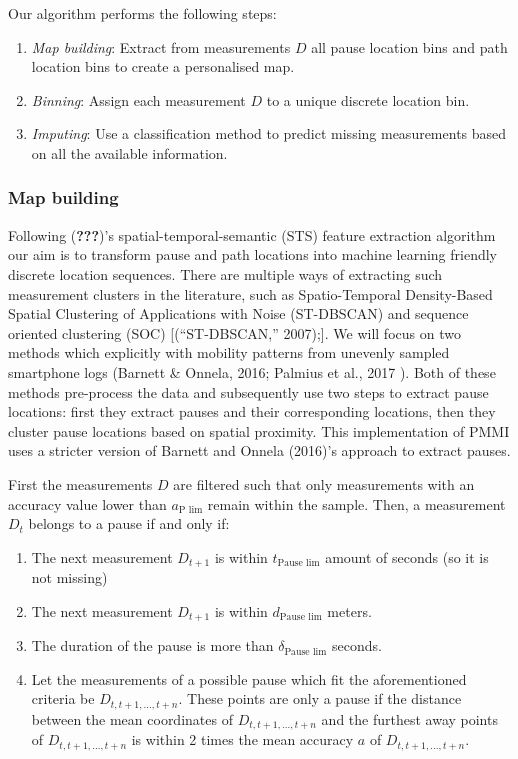 \documentclass[man]{apa6}
\providecommand{\tightlist}{%
  \setlength{\itemsep}{0pt}\setlength{\parskip}{0pt}}
\theoremstyle{definition}
\theoremstyle{definition}
\theoremstyle{definition}
\theoremstyle{remark}
\begin{document}
Our algorithm performs the following steps:

\begin{enumerate}
\def\labelenumi{\arabic{enumi}.}
\tightlist
\item
  \emph{Map building}: Extract from measurements \(D\) all pause
  location bins and path location bins to create a personalised map.
\item
  \emph{Binning}: Assign each measurement \(D\) to a unique discrete
  location bin.
\item
  \emph{Imputing}: Use a classification method to predict missing
  measurements based on all the available information.
\end{enumerate}

\subsubsection{Map building}\label{map-building}

Following ({\textbf{???}})'s spatial-temporal-semantic (STS) feature
extraction algorithm our aim is to transform pause and path locations
into machine learning friendly discrete location sequences. There are
multiple ways of extracting such measurement clusters in the literature,
such as Spatio-Temporal Density-Based Spatial Clustering of Applications
with Noise (ST-DBSCAN) and sequence oriented clustering (SOC)
{[}(``ST-DBSCAN,'' 2007);{]}. We will focus on two methods which
explicitly with mobility patterns from unevenly sampled smartphone logs
(Barnett \& Onnela, 2016; Palmius et al., 2017 ). Both of these methods
pre-process the data and subsequently use two steps to extract pause
locations: first they extract pauses and their corresponding locations,
then they cluster pause locations based on spatial proximity. This
implementation of PMMI uses a stricter version of Barnett and Onnela
(2016)'s approach to extract pauses.

First the measurements \(D\) are filtered such that only measurements
with an accuracy value lower than \(a_{\text{P lim}}\) remain within the
sample. Then, a measurement \(D_t\) belongs to a pause if and only if:

\begin{enumerate}
\def\labelenumi{\arabic{enumi}.}
\tightlist
\item
  The next measurement \(D_{t+1}\) is within \(t_{\text{Pause lim}}\)
  amount of seconds (so it is not missing)
\item
  The next measurement \(D_{t+1}\) is within \(d_{\text{Pause lim}}\)
  meters.
\item
  The duration of the pause is more than \(\delta_{\text{Pause lim}}\)
  seconds.
\item
  Let the measurements of a possible pause which fit the aforementioned
  criteria be \(D_{t,t+1,...,t+n}\). These points are only a pause if
  the distance between the mean coordinates of \(D_{t,t+1,...,t+n}\) and
  the furthest away points of \(D_{t,t+1,...,t+n}\) is within 2 times
  the mean accuracy \(a\) of \(D_{t,t+1,...,t+n}\).
\end{enumerate}
\end{document}
